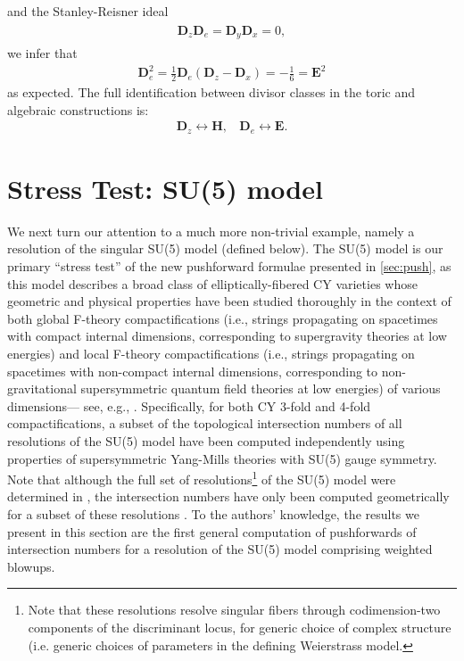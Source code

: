 \documentclass[11pt,oneside,english]{article}
\numberwithin{equation}{section}
\theoremstyle{definition}
\begin{document}
and the Stanley-Reisner ideal
	\begin{align}
	\begin{split}
		\boldsymbol D_z  \boldsymbol D_e= \boldsymbol D_y  \boldsymbol D_x=0,
	\end{split}
	\end{align}
	we infer that
	\begin{align}
		\boldsymbol{D}_e^2 =\frac{1}{2} \boldsymbol{D}_e  ( \boldsymbol D_z - \boldsymbol D_x) = - \frac{1}{6} = \boldsymbol{E}^2
	\end{align}
as expected. The full identification between divisor classes in the toric and algebraic constructions is:
	\begin{align}
		\boldsymbol{D}_z \leftrightarrow \boldsymbol{H}, ~~~~ \boldsymbol{D}_e \leftrightarrow \boldsymbol{E}. 
	\end{align}




\section{Stress Test: SU(5) model}
\label{sec:SU5}

We next turn our attention to a much more non-trivial example, namely a resolution of the singular SU(5) model (defined below). The SU(5) model is our primary ``stress test'' of the new pushforward formulae presented in \cref{sec:push}, as this model describes a broad class of elliptically-fibered CY varieties whose geometric and physical properties have been studied thoroughly in the context of both global F-theory compactifications (i.e., strings propagating on spacetimes with compact internal dimensions, corresponding to supergravity theories at low energies) and local F-theory compactifications (i.e., strings propagating on spacetimes with non-compact internal dimensions, corresponding to non-gravitational supersymmetric quantum field theories at low energies) of various dimensions--- see, e.g., \cite{Beasley:2008dc,Donagi:2008kj,Esole:2011sm,Grimm:2011fx,Hayashi:2013lra}. Specifically, for both CY 3-fold and 4-fold compactifications, a subset of the topological intersection numbers of all resolutions of the SU(5) model have been computed independently using properties of supersymmetric Yang-Mills theories with SU(5) gauge symmetry. Note that although the full set of resolutions\footnote{Note that these resolutions resolve singular fibers through codimension-two components of the discriminant locus, for generic choice of complex structure (i.e. generic choices of parameters in the defining Weierstrass model.} of the SU(5) model were determined in \cite{Esole:2014hya}, the intersection numbers have only been computed geometrically for a subset of these resolutions \cite{Esole:2015xfa,Jefferson:2021bid}. To the authors' knowledge, the results we present in this section are the first general computation of pushforwards of intersection numbers for a resolution of the SU(5) model comprising weighted blowups.
\end{document}
